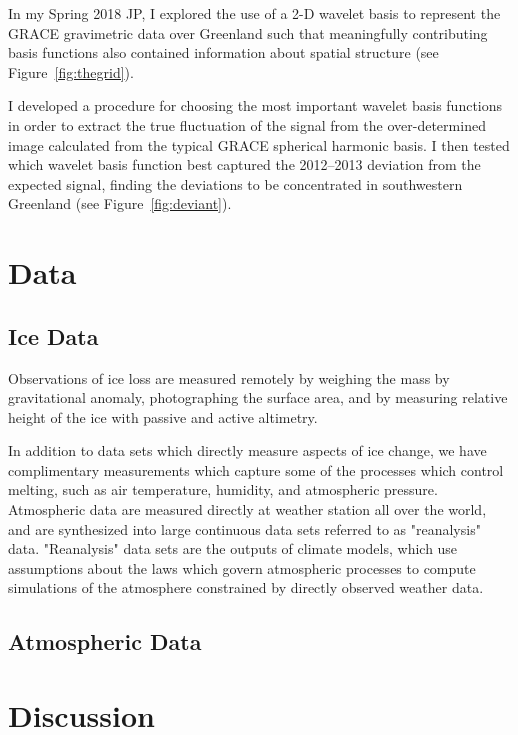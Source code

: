 \documentclass[11pt]{report}
\begin{document}
In my Spring 2018 JP, I explored the use of a 2-D wavelet basis to represent the GRACE gravimetric data over Greenland such that meaningfully contributing basis functions also contained information about spatial structure (see
Figure~\ref{fig:thegrid}). 

I developed a procedure for choosing the most important wavelet basis functions in order to extract the true fluctuation of the signal from the over-determined image calculated from the typical GRACE spherical harmonic basis. I then tested which wavelet basis function best captured the 2012--2013 deviation from the expected signal, finding the deviations to be concentrated in southwestern Greenland (see
Figure~\ref{fig:deviant}). 



\section{Data}

\subsection{Ice Data}

Observations of ice loss are measured remotely by weighing the mass by gravitational anomaly, photographing the surface area, and by measuring relative height of the ice with passive and active altimetry.

In addition to data sets which directly measure aspects of ice change, we have complimentary measurements which capture some of the processes which control melting, such as air temperature, humidity, and atmospheric pressure. Atmospheric data are measured directly at weather station all over the world, and are synthesized into large continuous data sets referred to as "reanalysis" data. "Reanalysis" data sets are the outputs of climate models, which use assumptions about the laws which govern atmospheric processes to compute simulations of the atmosphere constrained by directly observed weather data.
 
 \subsection{Atmospheric Data}


\section{Discussion}
\end{document}
